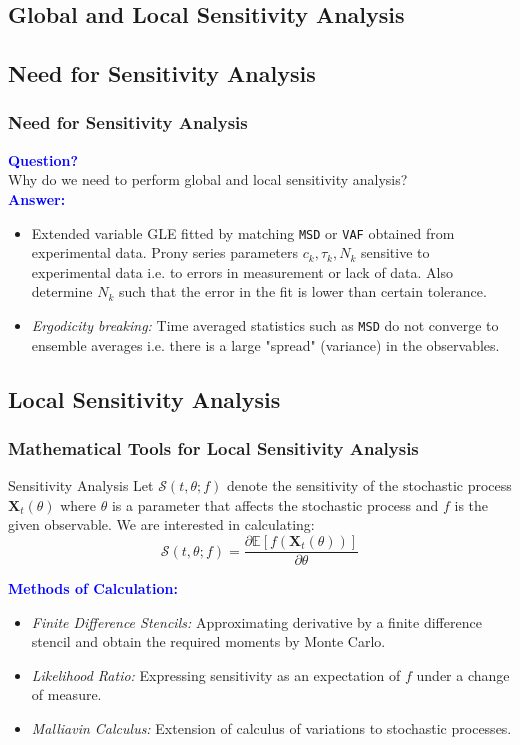 \documentclass[a4paper,10pt]{beamer}
\newcommand{\BS}[1]{\boldsymbol{#1}}
\newcommand{\E}[1]{\mathbb{E}\left[ #1 \right]}
\newcommand{\rb}[1]{\left( #1 \right)}
\begin{document}
	\begin{frame}
		\section{Global and Local Sensitivity Analysis}
		\subsection{Need for Sensitivity Analysis}
		\frametitle{Need for Sensitivity Analysis}
		\textcolor{blue}{\textbf{Question?}} \\ \vspace{0.2cm} Why do we need to perform global and local sensitivity analysis? \vspace{0.2cm} \\
		\textcolor{blue}{\textbf{Answer:}} \\
		\begin{itemize}
			\item {Extended variable GLE fitted by matching \texttt{MSD} or \texttt{VAF} obtained from experimental data. Prony series parameters $c_{k},\tau_{k},N_{k}$ sensitive to experimental data i.e. to errors in measurement or lack of data. Also determine $N_{k}$ such that the error in the fit is lower than certain tolerance.}
			\item {\textit{Ergodicity breaking:} Time averaged statistics such as \texttt{MSD} do not converge to ensemble averages i.e. there is a large "spread" (variance) in the observables.}
		\end{itemize}
	\end{frame}

	\begin{frame}
		\subsection{Local Sensitivity Analysis}
		\frametitle{Mathematical Tools for Local Sensitivity Analysis}
		\begin{block}{Sensitivity Analysis}
			Let $\mathcal{S}\rb{t,\theta;f}$ denote the sensitivity of the stochastic process $\BS{X}_{t}\rb{\theta}$ where $\theta$ is a parameter that affects the stochastic process and $f$ is the given observable. We are interested in calculating:
			$$ \mathcal{S}\rb{t,\theta;f} = \frac{\partial \E{f\rb{\BS{X}_{t}\rb{\theta}}}}{\partial \theta}$$
		\end{block}
		\textcolor{blue}{\textbf{Methods of Calculation:}}
		\begin{itemize}
			\item {\textit{{Finite Difference Stencils:}} Approximating derivative by a finite difference stencil and obtain the required moments by Monte Carlo.}
			\item {\textit{{Likelihood Ratio:}} Expressing sensitivity as an expectation of $f$ under a change of measure.}
			\item {\textit{{Malliavin Calculus:}} Extension of calculus of variations to stochastic processes.}
		\end{itemize}
	\end{frame}
	
\end{document}
